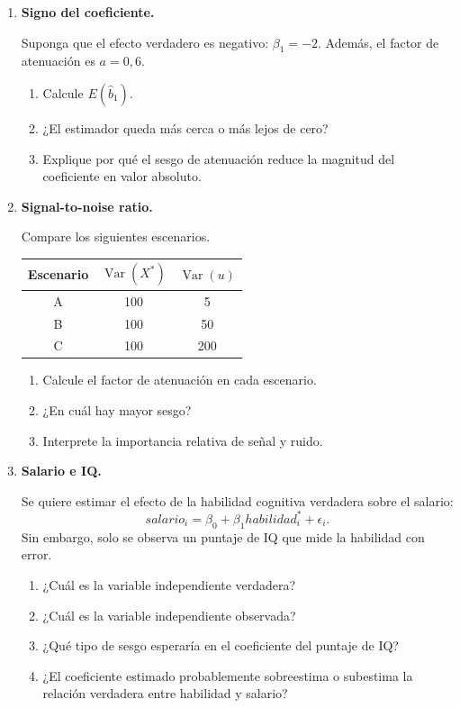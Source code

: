 \documentclass[11pt]{article}
\begin{document}
\begin{enumerate}[label=\textbf{Ejercicio \arabic*.}, leftmargin=*]
\item \textbf{Signo del coeficiente.}

Suponga que el efecto verdadero es negativo: $\beta_1=-2$. Además, el factor de atenuación es $a=0{,}6$.

\begin{enumerate}[label=\alph*)]
    \item Calcule $E(\hat{b}_1)$.
    \item ¿El estimador queda más cerca o más lejos de cero?
    \item Explique por qué el sesgo de atenuación reduce la magnitud del coeficiente en valor absoluto.
\end{enumerate}

\item \textbf{Signal-to-noise ratio.}

Compare los siguientes escenarios.

\begin{center}
\begin{tabular}{ccc}
\toprule
Escenario & $\operatorname{Var}(X^*)$ & $\operatorname{Var}(u)$ \\
\midrule
A & 100 & 5 \\
B & 100 & 50 \\
C & 100 & 200 \\
\bottomrule
\end{tabular}
\end{center}

\begin{enumerate}[label=\alph*)]
    \item Calcule el factor de atenuación en cada escenario.
    \item ¿En cuál hay mayor sesgo?
    \item Interprete la importancia relativa de señal y ruido.
\end{enumerate}

\item \textbf{Salario e IQ.}

Se quiere estimar el efecto de la habilidad cognitiva verdadera sobre el salario:
\[
salario_i=\beta_0+\beta_1 habilidad_i^*+\epsilon_i.
\]
Sin embargo, solo se observa un puntaje de IQ que mide la habilidad con error.

\begin{enumerate}[label=\alph*)]
    \item ¿Cuál es la variable independiente verdadera?
    \item ¿Cuál es la variable independiente observada?
    \item ¿Qué tipo de sesgo esperaría en el coeficiente del puntaje de IQ?
    \item ¿El coeficiente estimado probablemente sobreestima o subestima la relación verdadera entre habilidad y salario?
\end{enumerate}


\end{enumerate}
\end{document}
